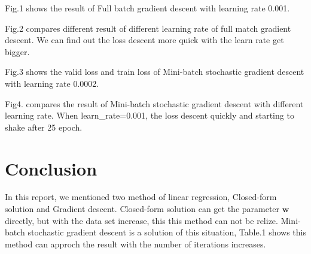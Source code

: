 \documentclass[journal, a4paper]{IEEEtran}
\begin{document}
Fig.1 shows the result of Full batch gradient descent with learning rate 0.001.

Fig.2 compares different result of different learning rate of full match gradient descent. We can find out the loss descent more quick with the learn rate get bigger.

Fig.3 shows the valid loss and train loss of Mini-batch stochastic gradient descent with learning rate 0.0002.

Fig4. compares the result of Mini-batch stochastic gradient descent with different learning rate. When learn\_rate=0.001, the loss descent quickly and  starting to shake after 25 epoch.

\section{Conclusion}
	In this report, we mentioned two method of linear regression, Closed-form solution and Gradient descent. Closed-form solution can get the parameter $\boldsymbol{w}$ directly, but with the data set increase, this this method can not be relize. Mini-batch stochastic gradient descent is a solution of this situation, Table.1 shows this method can approch the result with the number of iterations increases.
\end{document}

